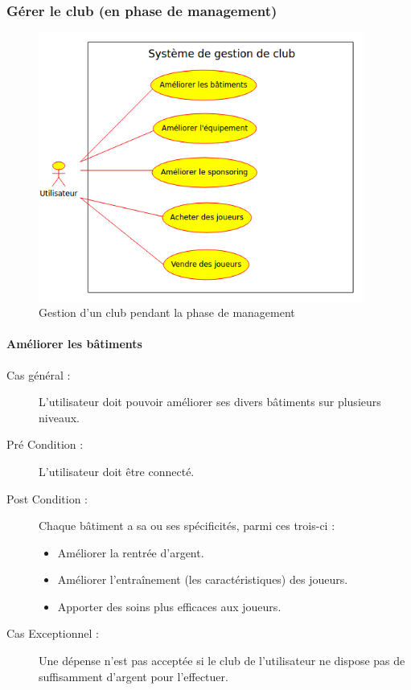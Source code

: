 \documentclass[a4paper]{article}
\begin{document}
\subsubsection{Gérer le \gls{club} (en phase de management)}

\begin{figure}[H]
   \begin{center}
   \includegraphics[height=250pt]{uml/mngClub.png}
   \caption{\label{diag-use-management} Gestion d'un \gls{club} pendant la phase de management}
   \end{center}
\end{figure}

\paragraph{Améliorer les bâtiments}
\begin{description}
\item[Cas général :] L'\gls{utilisateur} doit pouvoir améliorer ses divers bâtiments sur plusieurs niveaux. 
\item[Pré Condition  :] L'\gls{utilisateur} doit être connecté.
\item[Post Condition :] Chaque bâtiment a sa ou ses spécificités, parmi ces trois-ci :
	\begin{itemize}
	\item Améliorer la rentrée d'argent.
	\item  Améliorer l'entraînement (les caractéristiques) des \glspl{joueur}.
	\item  Apporter des soins plus efficaces aux \glspl{joueur}.
	\end{itemize}
\item[Cas Exceptionnel :] Une dépense n'est pas acceptée si le \gls{club} de l'\gls{utilisateur} ne dispose pas de suffisamment d'argent pour l'effectuer.
\end{description}
\end{document}
